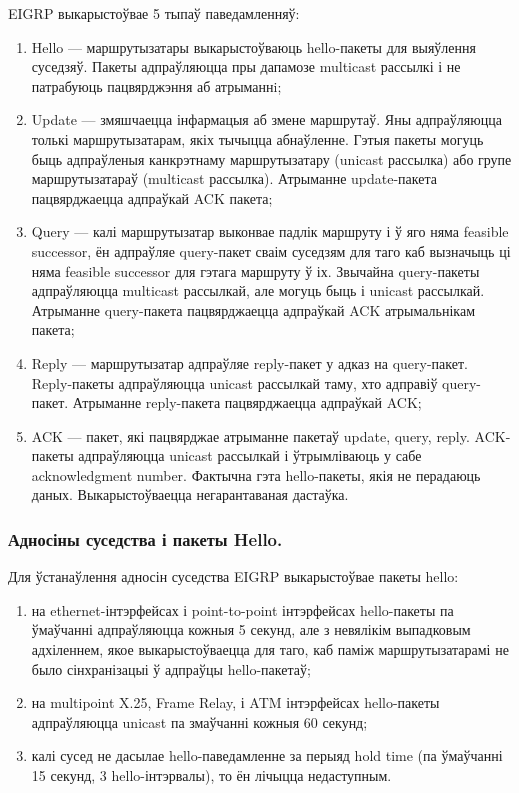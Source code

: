EIGRP выкарыстоўвае 5 тыпаў паведамленняў:
\begin{enumerate}
    \item Hello --- маршрутызатары выкарыстоўваюць hello-пакеты для выяўлення суседзяў. Пакеты адпраўляюцца пры дапамозе multicast рассылкі і не патрабуюць пацвярджэння аб атрыманнi;
    \item Update --- змяшчаецца інфармацыя аб змене маршрутаў. Яны адпраўляюцца толькі маршрутызатарам, якіх тычыцца абнаўленне. Гэтыя пакеты могуць быць адпраўленыя канкрэтнаму маршрутызатару (unicast рассылка) або групе маршрутызатараў (multicast рассылка). Атрыманне update-пакета пацвярджаецца адпраўкай ACK пакета;
    \item Query --- калі маршрутызатар выконвае падлік маршруту і ў яго няма feasible successor, ён адпраўляе query-пакет сваім суседзям для таго каб вызначыць ці няма feasible successor для гэтага маршруту ў іх. Звычайна query-пакеты адпраўляюцца multicast рассылкай, але могуць быць і unicast рассылкай. Атрыманне query-пакета пацвярджаецца адпраўкай ACK атрымальнікам пакета;
    \item Reply --- маршрутызатар адпраўляе reply-пакет у адказ на query-пакет. Reply-пакеты адпраўляюцца unicast рассылкай таму, хто адправіў query-пакет. Атрыманне reply-пакета пацвярджаецца адпраўкай ACK;
    \item ACK --- пакет, які пацвярджае атрыманне пакетаў update, query, reply. ACK-пакеты адпраўляюцца unicast рассылкай і ўтрымліваюць у сабе acknowledgment number. Фактычна гэта hello-пакеты, якія не перадаюць даных. Выкарыстоўваецца негарантаваная дастаўка.
\end{enumerate}

\subsubsection{Адносіны суседства і пакеты Hello.}

Для ўстанаўлення адносін суседства EIGRP выкарыстоўвае пакеты hello:
\begin{enumerate}
    \item на ethernet-інтэрфейсах і point-to-point інтэрфейсах hello-пакеты па ўмаўчанні адпраўляюцца кожныя 5 секунд, але з невялікім выпадковым адхіленнем, якое выкарыстоўваецца для таго, каб паміж маршрутызатарамі не было сінхранізацыі ў адпраўцы hello-пакетаў;
    \item на multipoint X.25, Frame Relay, і ATM інтэрфейсах hello-пакеты адпраўляюцца unicast па змаўчанні кожныя 60 секунд;
    \item калі сусед не дасылае hello-паведамленне за перыяд hold time (па ўмаўчанні 15 секунд, 3 hello-інтэрвалы), то ён лічыцца недаступным.
\end{enumerate}

